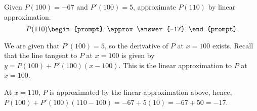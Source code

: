 \documentclass{ximera}
\author{Gregory Hartman \and Matthew Carr}
\begin{document}
\begin{exercise}






Given $P(100)=-67$ and $P'(100)=5$, approximate $P(110)$ by linear approximation.
\[
P(110)
\begin{prompt}
\approx \answer{-17}
\end{prompt}
\]

\begin{hint}
We are given that $P'(100)=5$, so the derivative of $P$ at $x=100$ exists. Recall that the line tangent to $P$ at $x=100$ is given by $y=P(100)+P'(100)(x-100)$. This is the linear approximation to $P$ at $x=100$.
\end{hint}
\begin{hint}
At $x=110$, $P$ is approximated by the linear approximation above, hence, $P(100)+P'(100)(110-100)=-67+5(10)=-67+50=-17$.
\end{hint}
\end{exercise}
\end{document}
